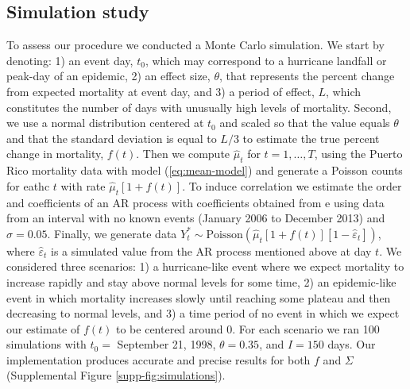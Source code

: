 \documentclass[11pt]{article}
\begin{document}
\subsection{Simulation study}
\label{subsec:simulations}
To assess our procedure we conducted a Monte Carlo simulation. We start by denoting: 1) an event day, $t_0$, which may correspond to a hurricane landfall or peak-day of an epidemic, 2) an effect size, $\theta$, that represents the percent change from expected mortality at event day, and 3) a period of effect, $L$, which constitutes the number of days with unusually high levels of mortality. Second, we use a normal distribution centered at $t_0$ and scaled so that the value equals $\theta$ and that the standard deviation is equal to $L/3$ to estimate the true percent change in mortality, $f(t)$. Then we compute $\hat{\mu}_t$ for $t=1,\ldots, T$, using the Puerto Rico mortality data with model (\ref{eq:mean-model}) and generate a Poisson counts for eathc $t$ with rate $\hat{\mu}_t\left[1+f(t)\right]$. To induce correlation we estimate the order and coefficients of an AR process with coefficients obtained from e using data from an interval with no known events (January 2006 to December 2013) and $\sigma = 0.05$. Finally, we generate data $Y_t^* \sim \mbox{Poisson}\left(\hat{\mu}_t[1+f(t)][1 - \hat{\varepsilon}_t]\right)$, where $\hat{\varepsilon}_t$ is a simulated value from the AR process mentioned above at day $t$. We considered three scenarios: 1) a hurricane-like event where we expect mortality to increase rapidly and stay above normal levels for some time, 2) an epidemic-like event in which mortality increases slowly until reaching some plateau and then decreasing to normal levels, and 3) a time period of no event in which we expect our estimate of $f(t)$ to be centered around 0. For each scenario we ran 100 simulations with $t_0 = $ September 21, 1998, $\theta = 0.35$, and $I=150$ days. Our implementation produces accurate and precise results for both $f$ and $\Sigma$ (Supplemental Figure \ref{supp-fig:simulations}).
\end{document}
